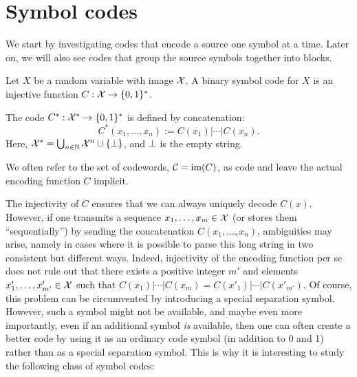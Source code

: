 



\section{Symbol codes}
We start by investigating codes that encode a source one symbol at a time. Later on, we will also see codes that group the source symbols together into blocks.
\begin{definition}
Let $X$ be a random variable with image ${\cal X}$. A binary symbol code for $X$ is an injective function $C : {\cal X} \to \{0,1\}^*$.

The  code $C^* : {\cal X}^* \to \{0,1\}^*$ is defined by concatenation:
\[
C^*(x_1, ..., x_n) := C(x_1) | \cdots |C(x_n).
\]
Here, ${\cal X}^* = \bigcup_{n \in \mathbb{N}} {\cal X}^n \cup \{\bot\}$, and $\bot$ is the empty string.
\end{definition}
We often refer to the set of codewords, ${\cal C} = \mathrm{im}(C)$, as code and leave the actual encoding function $C$ implicit. 

The injectivity of $C$ ensures that we can always uniquely decode $C(x)$. However, if one transmits a sequence $x_1, \ldots, x_m\in {\cal X}$
(or stores them ``sequentially'') by sending the concatenation $C(x_1, ..., x_n)$, ambiguities may arise, namely in cases where it is possible to parse this long
string in two consistent but different ways. Indeed, injectivity of
the encoding function per se does not rule out that there exists a
positive integer $m'$ and elements $x'_1, \ldots, x'_{m'}\in {\cal X}$
such that $C(x_1)| \cdots | C(x_m)=C(x'_1)| \cdots | C(x'_{m'})$. Of course, this problem can be circumvented by introducing a special separation symbol. However, such a symbol might not be available, and maybe even more importantly, even if an additional symbol {\em is} available, then one can often create a better code by using it as an ordinary code symbol (in addition to 0 and 1) rather than as a special separation symbol. This is why it is interesting to study the following class of symbol codes:

